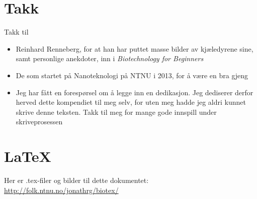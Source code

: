 \begin{appendices}
{\section{Takk}
Takk til
\begin{itemize}[noitemsep,nolistsep]
	\item Reinhard Renneberg, for at han har puttet masse bilder av kjæledyrene sine, samt personlige anekdoter, inn i \emph{Biotechnology for Beginners}
	\item De som startet på Nanoteknologi på NTNU i 2013, for å være en bra gjeng
	\item Jeg har fått en forespørsel om å legge inn en dedikasjon. Jeg dediserer derfor herved dette kompendiet til meg selv, for uten meg hadde jeg aldri kunnet skrive denne teksten. Takk til meg for mange gode innspill under skriveprosessen
\end{itemize}

\section{LaTeX}
Her er .tex-filer og bilder til dette dokumentet: \url{http://folk.ntnu.no/jonathrg/biotex/}
} %
\end{appendices}